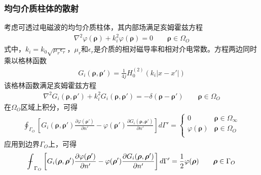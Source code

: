 \documentclass{article}
\numberwithin{equation}{section}
\renewcommand{\vec}[1]{\boldsymbol{#1}}
\begin{document}
\subsubsection{均匀介质柱体的散射}
考虑可透过电磁波的均匀介质柱体，其内部场满足亥姆霍兹方程
\begin{align}
    \label{eq:eq920}
    \nabla^2\varphi(\vec{\rho})+k_i^2\varphi(\vec{\rho})=0\qquad\vec{\rho}\in\Omega_O
\end{align}
式中，$k_i=k_0\sqrt{\mu_r\epsilon_r}$，$\mu_r$和$\epsilon_r$是介质的相对磁导率和相对介电常数。方程两边同时乘以格林函数
\begin{align}
    \label{eq:eq921}
    G_i(\vec{\rho},\vec{\rho}')=\frac{1}{4j}H_0^{(2)}(k_i|x-x'|)
\end{align}
该格林函数满足亥姆霍兹方程
\begin{align}
    \label{eq:eq922}
    \nabla^2G_i(\vec{\rho},\vec{\rho}')+k_i^2G_i(\vec{\rho},\vec{\rho}')=-\delta(\vec{\rho}-\vec{\rho}')\qquad\vec{\rho}\in\Omega_O
\end{align}
在$\Omega_O$区域上积分，可得
\begin{align}
    \label{eq:eq923}
    \oint_{\Gamma_O}\left[G_i(\vec{\rho},\vec{\rho}')\frac{\partial \varphi(\vec{\rho}')}{\partial n'}-\varphi(\vec{\rho}')\frac{\partial G_i(\vec{\rho},\vec{\rho}')}{\partial n'}\right]d\Gamma'
    =\left\{
        \begin{matrix}
            0 & \vec{\rho}\in\Omega_{\infty} \\
             \varphi(\vec{\rho}) & \vec{\rho}\in\Omega_{O} \\
        \end{matrix}
    \right.
\end{align}
应用到边界$\Gamma_O$上，可得
\begin{align}
    \label{eq:eq924}
    \bbint_{\Gamma_O}\left[G_i(\vec{\rho},\vec{\rho}')\frac{\partial \varphi(\vec{\rho}')}{\partial n'}-\varphi(\vec{\rho}')\frac{\partial G_i(\vec{\rho},\vec{\rho}')}{\partial n'}\right]d\Gamma'=\frac{1}{2}\varphi(\vec{\rho})\qquad\vec{\rho}\in\Gamma_O
\end{align}
\end{document}
